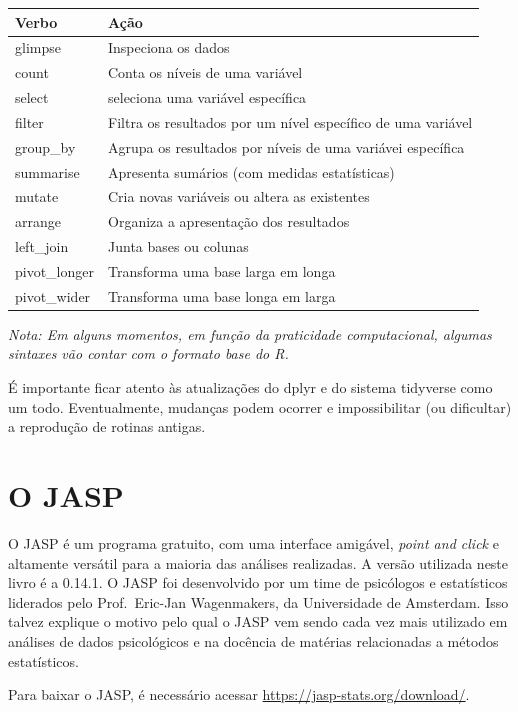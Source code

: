 \documentclass[
]{book}
\begin{document}
\begin{longtable}[]{@{}ll@{}}
\toprule
Verbo & Ação \\
\midrule
\endhead
glimpse & Inspeciona os dados \\
count & Conta os níveis de uma variável \\
select & seleciona uma variável específica \\
filter & Filtra os resultados por um nível específico de uma variável \\
group\_by & Agrupa os resultados por níveis de uma variávei específica \\
summarise & Apresenta sumários (com medidas estatísticas) \\
mutate & Cria novas variáveis ou altera as existentes \\
arrange & Organiza a apresentação dos resultados \\
left\_join & Junta bases ou colunas \\
pivot\_longer & Transforma uma base larga em longa \\
pivot\_wider & Transforma uma base longa em larga \\
\bottomrule
\end{longtable}

\emph{Nota: Em alguns momentos, em função da praticidade computacional, algumas sintaxes vão contar com o formato base do R.}

É importante ficar atento às atualizações do dplyr e do sistema tidyverse como um todo. Eventualmente, mudanças podem ocorrer e impossibilitar (ou dificultar) a reprodução de rotinas antigas.

\hypertarget{o-jasp}{%
\section{O JASP}\label{o-jasp}}

O JASP é um programa gratuito, com uma interface amigável, \emph{point and click} e altamente versátil para a maioria das análises realizadas. A versão utilizada neste livro é a 0.14.1. O JASP foi desenvolvido por um time de psicólogos e estatísticos liderados pelo Prof.~Eric-Jan Wagenmakers, da Universidade de Amsterdam. Isso talvez explique o motivo pelo qual o JASP vem sendo cada vez mais utilizado em análises de dados psicológicos e na docência de matérias relacionadas a métodos estatísticos.

Para baixar o JASP, é necessário acessar \url{https://jasp-stats.org/download/}.
\end{document}
